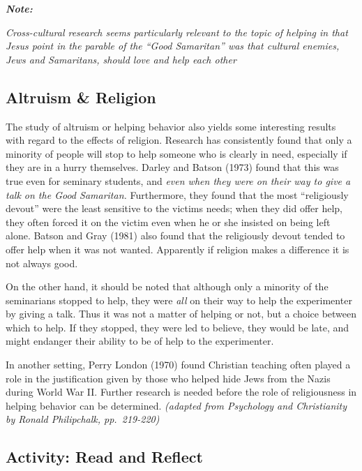 \documentclass[
]{book}
\begin{document}
\begin{caution}
\textbf{\emph{Note:}}

\emph{Cross-cultural research seems particularly relevant to the topic of helping in that Jesus point in the parable of the ``Good Samaritan'' was that cultural enemies, Jews and Samaritans, should love and help each other}
\end{caution}

\hypertarget{altruism-religion}{%
\subsection*{Altruism \& Religion}\label{altruism-religion}}

The study of altruism or helping behavior also yields some interesting results with regard to the effects of religion. Research has consistently found that only a minority of people will stop to help someone who is clearly in need, especially if they are in a hurry themselves. Darley and Batson (1973) found that this was true even for seminary students, and \emph{even when they were on their way to give a talk on the Good Samaritan.} Furthermore, they found that the most ``religiously devout'' were the least sensitive to the victims needs; when they did offer help, they often forced it on the victim even when he or she insisted on being left alone. Batson and Gray (1981) also found that the religiously devout tended to offer help when it was not wanted. Apparently if religion makes a difference it is not always good.

On the other hand, it should be noted that although only a minority of the seminarians stopped to help, they were \emph{all} on their way to help the experimenter by giving a talk. Thus it was not a matter of helping or not, but a choice between which to help. If they stopped, they were led to believe, they would be late, and might endanger their ability to be of help to the experimenter.

In another setting, Perry London (1970) found Christian teaching often played a role in the justification given by those who helped hide Jews from the Nazis during World War II. Further research is needed before the role of religiousness in helping behavior can be determined. \emph{(adapted from Psychology and Christianity by Ronald Philipchalk, pp.~219-220)}

\hypertarget{activity-read-and-reflect-11}{%
\subsection*{Activity: Read and Reflect}\label{activity-read-and-reflect-11}}
\end{document}
